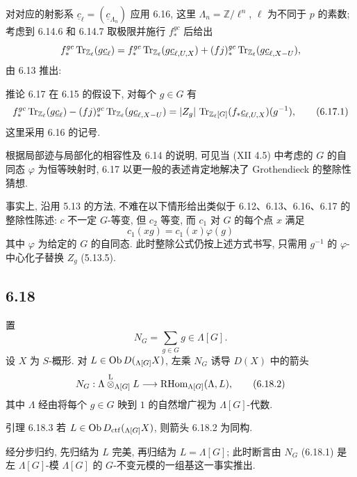 对对应的射影系 $\underline c_{\ell}=(\underline c_{\Lambda_n})$ 应用 6.16, 这里 $\Lambda_n=\mathbb Z/\ell^n$, $\ell$ 为不同于 $p$ 的素数; 考虑到 6.14.6 和 6.14.7 取极限并施行 $f_*^{gc}$ 后给出
\[
f_*^{gc}\operatorname{Tr}_{\mathbb Z_{\ell}}(g\underline c_{\ell})
=
f_*^{gc}\operatorname{Tr}_{\mathbb Z_{\ell}}(g\underline c_{\ell,U,X})
+(fj)_*^{gc}\operatorname{Tr}_{\mathbb Z_{\ell}}(g\underline c_{\ell,X-U}),
\]
由 6.13 推出:

\begin{statement}{推论 6.17}
在 6.15 的假设下, 对每个 $g\in G$ 有
\begin{equation}
f_*^{gc}\operatorname{Tr}_{\mathbb Z_{\ell}}(g\underline c_{\ell})
-(fj)_*^{gc}\operatorname{Tr}_{\mathbb Z_{\ell}}(g\underline c_{\ell,X-U})
=
|Z_g|\,\operatorname{Tr}_{\mathbb Z_{\ell}[G]}(f_*\underline c_{\ell,U,X})(g^{-1}),
\tag{6.17.1}
\end{equation}
这里采用 6.16 的记号.
\end{statement}

根据局部迹与局部化的相容性及 6.14 的说明, 可见当 (XII 4.5) 中考虑的 $G$ 的自同态 $\varphi$ 为恒等映射时, 6.17 以更一般的表述肯定地解决了 Grothendieck 的整除性猜想.

事实上, 沿用 5.13 的方法, 不难在以下情形给出类似于 6.12、6.13、6.16、6.17 的整除性陈述: $c$ 不一定 $G$-等变, 但 $c_2$ 等变, 而 $c_1$ 对 $G$ 的每个点 $x$ 满足
\[
c_1(xg)=c_1(x)\varphi(g)
\]
其中 $\varphi$ 为给定的 $G$ 的自同态. 此时整除公式仍按上述方式书写, 只需用 $g^{-1}$ 的 $\varphi$-中心化子替换 $Z_g$ (5.13.5).

\subsection*{6.18}
置
\begin{equation}
N_G=\sum_{g\in G} g\in\Lambda[G].
\tag{6.18.1}
\end{equation}
设 $X$ 为 $S$-概形. 对 $L\in\operatorname{Ob} D({}_{\Lambda[G]}X)$, 左乘 $N_G$ 诱导 $D(X)$ 中的箭头
\begin{equation}
N_G:\Lambda\overset{\mathrm L}{\otimes}_{\Lambda[G]}L
\longrightarrow
\mathrm{RHom}_{\Lambda[G]}(\Lambda,L),
\tag{6.18.2}
\end{equation}
其中 $\Lambda$ 经由将每个 $g\in G$ 映到 $1$ 的自然增广视为 $\Lambda[G]$-代数.

\begin{statement}{引理 6.18.3}
若 $L\in\operatorname{Ob} D_{\mathrm{ctf}}({}_{\Lambda[G]}X)$, 则箭头 6.18.2 为同构.
\end{statement}

经分步归约, 先归结为 $L$ 完美, 再归结为 $L=\Lambda[G]$; 此时断言由 $N_G$ (6.18.1) 是左 $\Lambda[G]$-模 $\Lambda[G]$ 的 $G$-不变元模的一组基这一事实推出.

